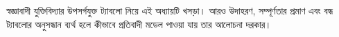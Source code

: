 \documentclass[../../../include/open-logic-chapter]{subfiles}
\begin{document}

\begin{editorial}
  স্বজ্ঞাবাদী যুক্তিবিদ্যার উপসর্গযুক্ত ট্যাবলো নিয়ে এই অধ্যায়টি
  খসড়া। আরও উদাহরণ, সম্পূর্ণতার প্রমাণ এবং বন্ধ ট্যাবলোর
  অনুসন্ধান ব্যর্থ হলে কীভাবে প্রতিবাদী মডেল পাওয়া যায় তার
  আলোচনা দরকার।
\end{editorial}


\OLEndChapterHook
\end{document}
